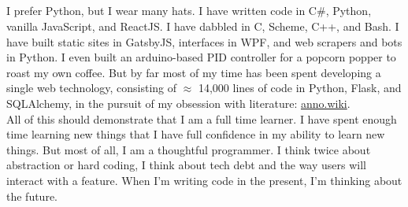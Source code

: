 \documentclass[9pt]{developercv} %
\begin{document}
\begin{minipage}[t]{0.275\textwidth} %
    \vspace{-\baselineskip} %

    \\
    \\
    \\
    \\
\end{minipage}




    I prefer Python, but I wear many hats. I have written code in C\#,
    Python, vanilla JavaScript, and ReactJS. I have dabbled in C, Scheme, C++,
    and Bash. I have built static sites in GatsbyJS, interfaces in WPF, and web
    scrapers and bots in Python. I even built an arduino-based PID controller
    for a popcorn popper to roast my own coffee. But by far most of my time has
    been spent developing a single web technology, consisting of $\approx$
    14,000 lines of code in Python, Flask, and SQLAlchemy, in the pursuit of my
    obsession with literature:
    {\href{https://github.com/malan88/icc}{anno.wiki}}.\\

    All of this should demonstrate that I am a full time learner. I have spent
    enough time learning new things that I have full confidence in my ability to
    learn new things. But most of all, I am a thoughtful programmer. I think
    twice about abstraction or hard coding, I think about tech debt and the way
    users will interact with a feature. When I'm writing code in the present,
    I'm thinking about the future.
\end{document}
